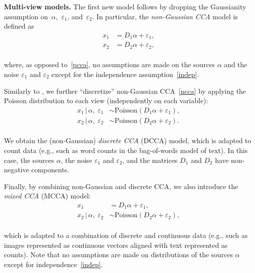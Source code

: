 \documentclass{article}
\newcommand{\ppp}{\textbf}
\newcommand{\poi}{\mathrm{Poisson}}
\begin{document}
\ppp{Multi-view models.}
The first new model follows 
by dropping the Gaussianity assumption on~$\alpha$,~$\varepsilon_1$, and~$\varepsilon_2$. In particular, the \emph{non-Gaussian CCA} model is defined as
\\[-0.7em]
\begin{equation}\label{ncca}
\begin{aligned}
x_1 &= D_1 \alpha + \varepsilon_1,\\
x_2 &= D_2 \alpha + \varepsilon_2,
\end{aligned}
\end{equation}
\\[-0.7em]
where, as opposed to~\eqref{pcca}, no assumptions are made on the sources $\alpha$ and the noise $\varepsilon_1$ and $\varepsilon_2$ except for the independence assumption~\eqref{indep}.

Similarly to
\citet{PodEtAl2015}, we further ``discretize'' non-Gaussian CCA~\eqref{ncca} by applying the Poisson distribution to each view (independently on each variable):
\\[-0.7em]
\begin{equation}\label{dcca}
\begin{aligned}
x_1\,|\,\alpha,\;\varepsilon_1 & \sim \poi (D_1\alpha + \varepsilon_1),\\
x_2\,|\,\alpha,\;\varepsilon_2 & \sim \poi (D_2\alpha + \varepsilon_2).
\end{aligned}
\end{equation}
\\[-0.7em]
We obtain the (non-Gaussian) \emph{discrete CCA} (DCCA) model, which is adapted to count data (e.g., such as word counts in the bag-of-words model of text). In this case, the sources $\alpha$, the noise $\varepsilon_1$ and $\varepsilon_2$, and the matrices $D_1$ and $D_2$ have non-negative components.

 
Finally, by combining non-Gaussian and discrete CCA, we also introduce the \emph{mixed CCA} (MCCA) model:
\\[-0.7em]
\begin{equation}\label{mcca}
\begin{aligned}
x_1 &=D_1\alpha + \varepsilon_1,\\
x_2\,|\,\alpha,\;\varepsilon_2 &\sim \poi (D_2\alpha + \varepsilon_2),
\end{aligned}
\end{equation}
\\[-0.7em]
which is adapted to a combination of discrete and continuous data (e.g., such as images represented as continuous vectors aligned with text represented as counts).  Note that no assumptions are made on distributions of the sources $\alpha$ except for independence~\eqref{indep}.
\end{document}
